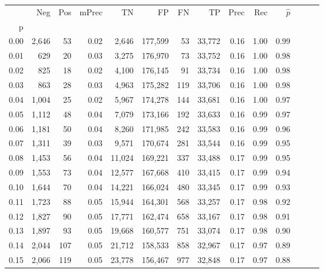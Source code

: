 \begin{tabular}{rrrrrrrrrrrrrr}
\toprule
{} &    Neg &  Pos & mPrec &       TN &       FP &      FN &      TP &  Prec &   Rec & $\hat{p}$ \\
p    &        &      &       &          &          &         &         &       &       &           \\
\midrule
0.00 &  2,646 &   53 &  0.02 &    2,646 &  177,599 &      53 &  33,772 &  0.16 &  1.00 &      0.99 \\
0.01 &    629 &   20 &  0.03 &    3,275 &  176,970 &      73 &  33,752 &  0.16 &  1.00 &      0.98 \\
0.02 &    825 &   18 &  0.02 &    4,100 &  176,145 &      91 &  33,734 &  0.16 &  1.00 &      0.98 \\
0.03 &    863 &   28 &  0.03 &    4,963 &  175,282 &     119 &  33,706 &  0.16 &  1.00 &      0.98 \\
0.04 &  1,004 &   25 &  0.02 &    5,967 &  174,278 &     144 &  33,681 &  0.16 &  1.00 &      0.97 \\
0.05 &  1,112 &   48 &  0.04 &    7,079 &  173,166 &     192 &  33,633 &  0.16 &  0.99 &      0.97 \\
0.06 &  1,181 &   50 &  0.04 &    8,260 &  171,985 &     242 &  33,583 &  0.16 &  0.99 &      0.96 \\
0.07 &  1,311 &   39 &  0.03 &    9,571 &  170,674 &     281 &  33,544 &  0.16 &  0.99 &      0.95 \\
0.08 &  1,453 &   56 &  0.04 &   11,024 &  169,221 &     337 &  33,488 &  0.17 &  0.99 &      0.95 \\
0.09 &  1,553 &   73 &  0.04 &   12,577 &  167,668 &     410 &  33,415 &  0.17 &  0.99 &      0.94 \\
0.10 &  1,644 &   70 &  0.04 &   14,221 &  166,024 &     480 &  33,345 &  0.17 &  0.99 &      0.93 \\
0.11 &  1,723 &   88 &  0.05 &   15,944 &  164,301 &     568 &  33,257 &  0.17 &  0.98 &      0.92 \\
0.12 &  1,827 &   90 &  0.05 &   17,771 &  162,474 &     658 &  33,167 &  0.17 &  0.98 &      0.91 \\
0.13 &  1,897 &   93 &  0.05 &   19,668 &  160,577 &     751 &  33,074 &  0.17 &  0.98 &      0.90 \\
0.14 &  2,044 &  107 &  0.05 &   21,712 &  158,533 &     858 &  32,967 &  0.17 &  0.97 &      0.89 \\
0.15 &  2,066 &  119 &  0.05 &   23,778 &  156,467 &     977 &  32,848 &  0.17 &  0.97 &      0.88 \\

\end{tabular}
